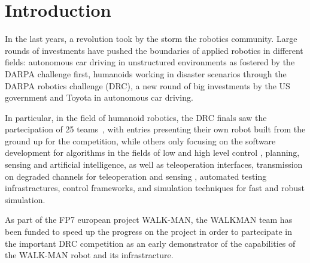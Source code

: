 \documentclass[%
	paper=A4,					%
	twoside=true,				%
	openright,			.
	parskip=full,				%
	chapterprefix=true,			%
	11pt,						%
	headings=normal,			%
	bibliography=totoc,			%
	listof=totoc,				%
	titlepage=on,				%
	captions=tableabove,		%
	draft=false,				%
]{scrreprt}%
\begin{document}

\pagestyle{empty}				%
\cleardoublepage

\pagestyle{plain}				%
\cleardoublepage
%
\setcounter{tocdepth}{2}		%
\tableofcontents				%
\cleardoublepage

\setcounter{page}{1}			%
\pagestyle{maincontentstyle} 	%

\chapter{Introduction}
In the last years, a revolution took by the storm the robotics community. Large rounds of investments have pushed the boundaries of applied robotics in different fields: autonomous car driving in unstructured environments as fostered by the DARPA challenge first, humanoids working in disaster scenarios through the DARPA robotics challenge (DRC), a new round of big investments by the US government and Toyota in autonomous car driving.

In particular, in the field of humanoid robotics,  the DRC finals saw the partecipation of 25 teams~\cite{DRC-what-happened}, with entries presenting their own robot built from the ground up for the competition, while others only focusing on the software development for algorithms in the fields of low and high level control \cite{beeson15, feng2015-rj, feng2015-oj}, planning, sensing and artificial intelligence, as well as teleoperation interfaces, transmission on degraded channels for teleoperation and sensing \cite{fallon2015-ni}, automated testing infrastractures, control frameworks, and simulation techniques for fast and robust simulation.

As part of the FP7 european project WALK-MAN, the WALKMAN team has been funded to speed up the progress on the project in order to partecipate in the important DRC competition as an early demonstrator of the capabilities of the WALK-MAN robot and its infrastracture.
\end{document}
